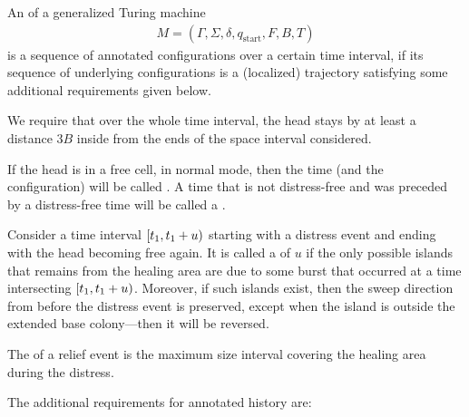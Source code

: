 \documentclass[12pt]{memoir}
\def\B{B}
\newcommand{\E}{E}
\newcommand{\R}{R}
\newcommand{\Tu}{T}
\newcommand{\start}{\mathrm{start}}
\begin{document}
\begin{definition}\label{def:annotated-hist}

An  of a generalized Turing machine
    \begin{align*}
        M=(\Gamma,\Sigma,\delta,q_{\start},F,B,\Tu{})
     \end{align*}
is a sequence of annotated configurations over a certain time interval,
if its sequence of underlying configurations is a 
(localized) trajectory satisfying some additional requirements given below.


We require that over the whole time interval, the head stays by at least a
distance \( 3\B \) inside from the ends of the space interval considered.

If the head is in a free cell, in normal mode, then
the time (and the configuration) will be called .
A time that is not distress-free and was preceded by
a distress-free time will be called a .

Consider a time interval \( [t_1,t_1+u) \) starting
with a distress event and ending with the head becoming free again.
It is called a  of  \( u \)
if the only possible islands that remains from the healing area
are due to some burst that occurred at a time intersecting \( [t_1,t_1 + u) \).
Moreover, if such islands exist, then the sweep direction from before the
distress event is preserved, except when the island is
outside the extended base colony---then it will be reversed.

The  of a relief event is the maximum size
interval covering the healing area during the distress.

    The additional requirements for annotated history are:

    \begin{enumerate}[(a)]


\end{enumerate}
\end{definition}
\end{document}
